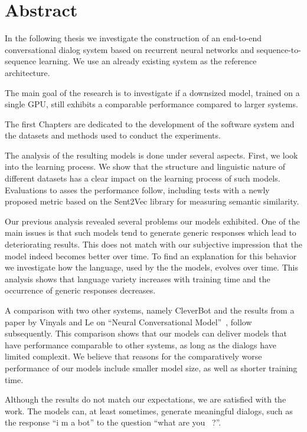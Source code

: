 \chapter*{Abstract}
In the following thesis we investigate the construction of an end-to-end conversational dialog system based on recurrent neural networks and sequence-to-sequence learning. We use an already existing system as the reference architecture. 

The main goal of the research is to investigate if a downsized model, trained on a single GPU, still exhibits a comparable performance compared to larger systems.

The first Chapters are dedicated to the development of the software system and the datasets and methods used to conduct the experiments.

The analysis of the resulting models is done under several aspects. First, we look into the learning process. We show that the structure and linguistic nature of different datasets has a clear impact on the learning process of such models. Evaluations to asses the performance follow, including tests with a newly proposed metric based on the Sent2Vec library for measuring semantic similarity.

Our previous analysis revealed several problems our models exhibited. One of the main issues is that such models tend to generate generic responses which lead to deteriorating results. This does not match with our subjective impression that the model indeed becomes better over time. To find an explanation for this behavior we investigate how the language, used by the the models, evolves over time. This analysis shows that language variety increases with training time and the occurrence of generic responses decreases.

A comparison with two other systems, namely CleverBot and the results from a paper by Vinyals and Le on ``Neural Conversational Model''~\cite{Vinyals:2015}, follow subsequently. This comparison shows that our models can deliver models that have performance comparable to other systems, as long as the dialogs have limited complexit. We believe that reasons for the comparatively worse performance of our models include smaller model size, as well as shorter training time.

Although the results do not match our expectations, we are satisfied with the work. The models can, at least sometimes, generate meaningful dialogs, such as the response ``i m a bot'' to the question ``what are you~ ?''.

